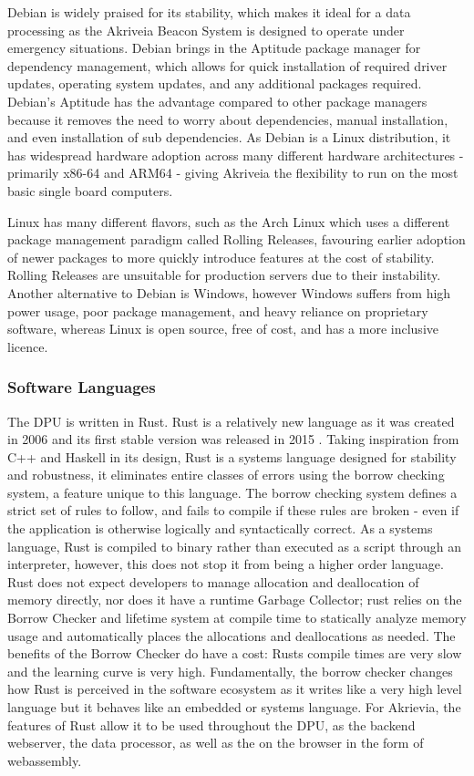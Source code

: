 \bigskip
Debian is widely praised for its stability, which makes it ideal for a data processing as the Akriveia Beacon System is designed to operate under emergency situations. Debian brings in the \Gls{Aptitude} package manager for dependency management, which allows for quick installation of required driver updates, operating system updates, and any additional packages required.
Debian's Aptitude has the advantage compared to other package managers because it removes the need to worry about dependencies, manual installation, and even installation of sub dependencies.
As Debian is a Linux distribution, it has widespread hardware adoption across many different hardware architectures - primarily \Gls{x86-64} and \Gls{ARM64} - giving Akriveia the flexibility to run on the most basic single board computers.

\bigskip
Linux has many different flavors, such as the Arch Linux which uses a different package management paradigm called \Gls{Rolling Releases}, favouring earlier adoption of newer packages to more quickly introduce features at the cost of stability.
\Gls{Rolling Releases} are unsuitable for production servers due to their instability.
Another alternative to Debian is Windows, however Windows suffers from high power usage, poor package management, and heavy reliance on proprietary software, whereas Linux is open source, free of cost, and has a more inclusive licence.

\pagebreak
\subsubsection{Software Languages}
\medskip
The DPU is written in \Gls{Rust}.
Rust is a relatively new language as it was created in 2006 \cite{rust_graydon_interview} and its first stable version was released in 2015 \cite{rust_releases}.
Taking inspiration from C++ and Haskell in its design, Rust is a systems language designed for stability and robustness, it eliminates entire classes of errors using the borrow checking system, a feature unique to this language.
The borrow checking system defines a strict set of rules to follow, and fails to compile if these rules are broken - even if the application is otherwise logically and syntactically correct.
As a systems language, Rust is compiled to binary rather than executed as a script through an interpreter, however, this does not stop it from being a higher order language.
Rust does not expect developers to manage allocation and deallocation of memory directly, nor does it have a runtime \Gls{Garbage Collector}; rust relies on the \Gls{Borrow Checker} and lifetime system at compile time to statically analyze memory usage and automatically places the allocations and deallocations as needed.
The benefits of the \Gls{Borrow Checker} do have a cost: Rusts compile times are very slow and the learning curve is very high.
Fundamentally, the borrow checker changes how Rust is perceived in the software ecosystem as it writes like a very high level language but it behaves like an embedded or systems language.
For Akrievia, the features of Rust allow it to be used throughout the DPU, as the backend webserver, the data processor, as well as the on the browser in the form of webassembly.

